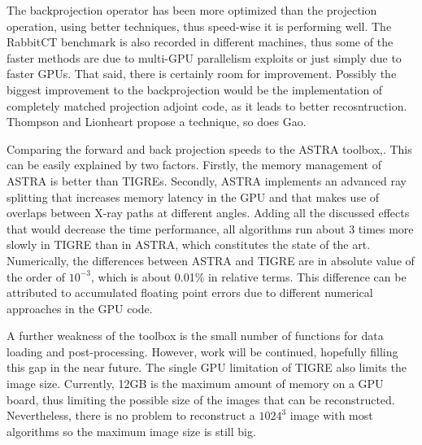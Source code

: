 The backprojection operator has been more optimized than the projection operation, using better techniques, thus speed-wise it is performing well. \color{black}{} The RabbitCT benchmark is also recorded in different machines, thus some of the faster methods are due to multi-GPU parallelism exploits or just simply due to faster GPUs. That said, there is certainly room for improvement. 
Possibly the biggest improvement to the backprojection  would be the implementation of completely matched projection adjoint code, as it leads to better recosntruction\cite{6829349}. Thompson and Lionheart\cite{thompson2014gpu} propose a technique, so does Gao\cite{gao2012fast}.

Comparing the forward and back projection speeds to the ASTRA toolbox\cite{ASTRA},\color{red}{ TIGRE is 2 times slower at its worst}. This can be easily explained by two factors. Firstly, the memory management of ASTRA is better than TIGREs.\color{black}{} Secondly, ASTRA implements an advanced ray splitting that increases memory latency in the GPU and that makes use of overlaps between X-ray paths at different angles\cite{Palenstijn2011250}. Adding all the discussed effects that would decrease the time performance, all algorithms run about 3 times more slowly in TIGRE than in ASTRA, which constitutes the state of the art. {Numerically, the differences between ASTRA and TIGRE are in absolute value of the order of $10^{-3}$, which is about 0.01\% in relative terms. This difference can be attributed to accumulated floating point errors due to different numerical approaches in the GPU code.}

 \color{red}{To speed up further the toolbox, a multi-GPU approach could also be taken. Currently, TIGRE does not support multi-GPU architectures.} \color{black}{} A further weakness of the toolbox is the small number of functions for data loading and post-processing. However, work will be continued, hopefully filling this gap in the near future. The single GPU limitation of TIGRE also limits the image size. Currently, 12GB is the maximum amount of memory on a GPU board, thus limiting the possible size of the images that can be reconstructed. Nevertheless, there is no problem to reconstruct a $1024^3$ image with most algorithms so the maximum image size is still big.

